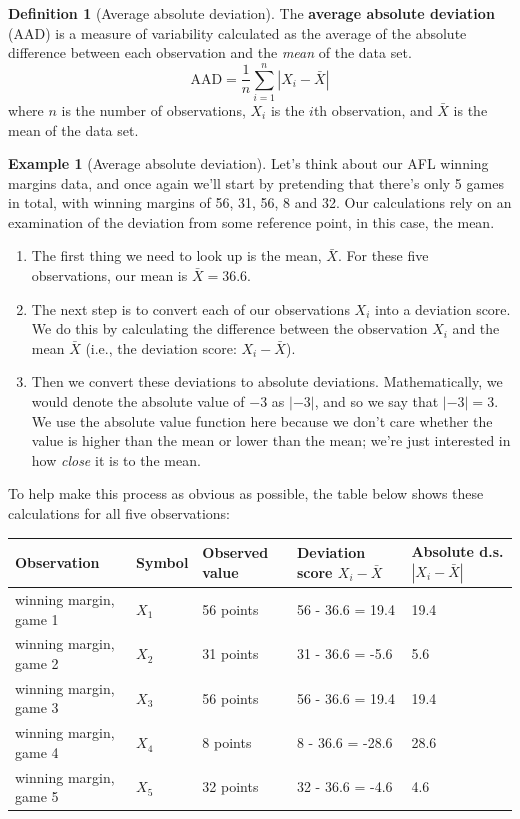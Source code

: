 \documentclass[
]{book}
\providecommand{\tightlist}{%
  \setlength{\itemsep}{0pt}\setlength{\parskip}{0pt}}
\theoremstyle{definition}
\newtheorem{definition}{Definition}[chapter]
\theoremstyle{definition}
\newtheorem{example}{Example}[chapter]
\theoremstyle{definition}
\theoremstyle{definition}
\theoremstyle{remark}
\begin{document}
\begin{definition}[Average absolute deviation]
\protect\hypertarget{def:defAAD}{}\label{def:defAAD}The \textbf{average absolute deviation} (AAD) is a measure of variability calculated as the average of the absolute difference between each observation and the \emph{mean} of the data set.
\[
\text{AAD} = \frac{1}{n} \sum_{i=1}^n |X_i - \bar{X}|
\]
where \(n\) is the number of observations, \(X_i\) is the \(i\)th observation, and \(\bar{X}\) is the mean of the data set.
\end{definition}

\begin{example}[Average absolute deviation]
\protect\hypertarget{exm:exAAD}{}\label{exm:exAAD}Let's think about our AFL winning margins data, and once again we'll start by pretending that there's only 5 games in total, with winning margins of 56, 31, 56, 8 and 32. Our calculations rely on an examination of the deviation from some reference point, in this case, the mean.

\begin{enumerate}
\def\labelenumi{\arabic{enumi}.}
\tightlist
\item
  The first thing we need to look up is the mean, \(\bar{X}\). For these five observations, our mean is \(\bar{X} = 36.6\).
\item
  The next step is to convert each of our observations \(X_i\) into a deviation score. We do this by calculating the difference between the observation \(X_i\) and the mean \(\bar{X}\) (i.e., the deviation score: \(X_i - \bar{X}\)).
\item
  Then we convert these deviations to absolute deviations. Mathematically, we would denote the absolute value of \(-3\) as \(|-3|\), and so we say that \(|-3| = 3\). We use the absolute value function here because we don't care whether the value is higher than the mean or lower than the mean; we're just interested in how \emph{close} it is to the mean.
\end{enumerate}

To help make this process as obvious as possible, the table below shows these calculations for all five observations:

\begin{longtable}[]{@{}lllll@{}}
\toprule()
Observation & Symbol & Observed value & Deviation score \(X_i - \bar{X}\) & Absolute d.s. \(|X_i - \bar{X}|\) \\
\midrule()
\endhead
winning margin, game 1 & \(X_1\) & 56 points & 56 - 36.6 = 19.4 & 19.4 \\
winning margin, game 2 & \(X_2\) & 31 points & 31 - 36.6 = -5.6 & 5.6 \\
winning margin, game 3 & \(X_3\) & 56 points & 56 - 36.6 = 19.4 & 19.4 \\
winning margin, game 4 & \(X_4\) & 8 points & 8 - 36.6 = -28.6 & 28.6 \\
winning margin, game 5 & \(X_5\) & 32 points & 32 - 36.6 = -4.6 & 4.6 \\
\bottomrule()
\end{longtable}


\end{example}
\end{document}
